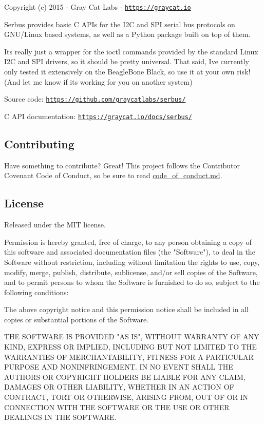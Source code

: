 Copyright (c) 2015 -\/ Gray Cat Labs -\/ \href{https://graycat.io}{\tt https\+://graycat.\+io}

Serbus provides basic C A\+P\+Is for the I2\+C and S\+P\+I serial bus protocols on G\+N\+U/\+Linux based systems, as well as a Python package built on top of them.

It\textquotesingle{}s really just a wrapper for the ioctl commands provided by the standard Linux I2\+C and S\+P\+I drivers, so it should be pretty universal. That said, I\textquotesingle{}ve currently only tested it extensively on the Beagle\+Bone Black, so use it at your own risk! (And let me know if it\textquotesingle{}s working for you on another system)


\begin{DoxyItemize}
\item Source code\+: \href{https://github.com/graycatlabs/serbus/}{\tt https\+://github.\+com/graycatlabs/serbus/}
\item C A\+P\+I documentation\+: \href{https://graycat.io/docs/serbus/}{\tt https\+://graycat.\+io/docs/serbus/}
\end{DoxyItemize}

\subsection*{Contributing}

Have something to contribute? Great! This project follows the Contributor Covenant Code of Conduct, so be sure to read {\ttfamily \hyperlink{code__of__conduct_8md_source}{code\+\_\+of\+\_\+conduct.\+md}}.

\subsection*{License}

Released under the M\+I\+T license. \begin{DoxyVerb}Permission is hereby granted, free of charge, to any person obtaining a copy
of this software and associated documentation files (the "Software"), to deal
in the Software without restriction, including without limitation the rights
to use, copy, modify, merge, publish, distribute, sublicense, and/or sell
copies of the Software, and to permit persons to whom the Software is
furnished to do so, subject to the following conditions:

The above copyright notice and this permission notice shall be included in
all copies or substantial portions of the Software.

THE SOFTWARE IS PROVIDED "AS IS", WITHOUT WARRANTY OF ANY KIND, EXPRESS OR
IMPLIED, INCLUDING BUT NOT LIMITED TO THE WARRANTIES OF MERCHANTABILITY,
FITNESS FOR A PARTICULAR PURPOSE AND NONINFRINGEMENT. IN NO EVENT SHALL THE
AUTHORS OR COPYRIGHT HOLDERS BE LIABLE FOR ANY CLAIM, DAMAGES OR OTHER
LIABILITY, WHETHER IN AN ACTION OF CONTRACT, TORT OR OTHERWISE, ARISING FROM,
OUT OF OR IN CONNECTION WITH THE SOFTWARE OR THE USE OR OTHER DEALINGS IN
THE SOFTWARE. \end{DoxyVerb}
 
